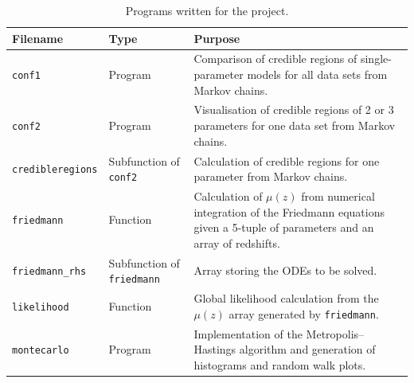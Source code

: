 \begin{table}[htbp]
\centering

\begin{threeparttable}
\caption{Programs written for the project.}
\label{tab:programs-written}

\begin{tabular}{@{} l l p{8cm} @{}}
\toprule
Filename & Type & Purpose \\
\midrule

\texttt{conf1} & Program &
Comparison of credible regions of single-parameter models for all data sets from Markov chains. \\

\texttt{conf2} & Program &
Visualisation of credible regions of 2 or 3 parameters for one data set from Markov chains. \\

\texttt{credibleregions} & Subfunction of \texttt{conf2} &
Calculation of credible regions for one parameter from Markov chains. \\

\texttt{friedmann} & Function &
Calculation of $\mu(z)$ from numerical integration of the Friedmann equations given a 5-tuple of parameters and an array of redshifts. \\

\texttt{friedmann\_rhs} & Subfunction of \texttt{friedmann} &
Array storing the ODEs to be solved. \\

\texttt{likelihood} & Function &
Global likelihood calculation from the $\mu(z)$ array generated by \texttt{friedmann}. \\

\texttt{montecarlo} & Program &
Implementation of the Metropolis--Hastings algorithm and generation of histograms and random walk plots. \\

\bottomrule
\end{tabular}

\end{threeparttable}
\end{table}
